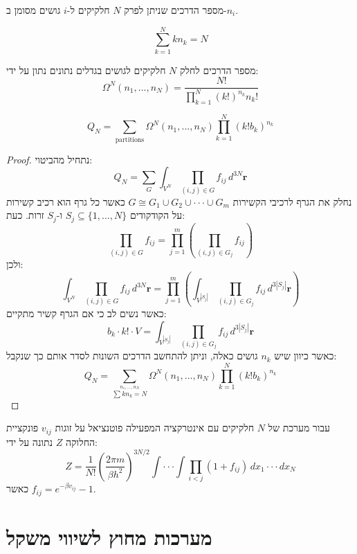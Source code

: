 \documentclass{tstextbook}
\begin{document}
\begin{symbolize}
מספר הדרכים שניתן לפרק \(N\) חלקיקים ל-\(i\) גושים מסומן ב-\(n_{i}\).

\end{symbolize}
\begin{corollary}
$$\sum_{k=1}^{N}k n_{k}=N$$

\end{corollary}
\begin{corollary}
מספר הדרכים לחלק \(N\) חלקיקים לגושים בגדלים נתונים נתון על ידי:
$$\Omega^{N}(n_{1},...,n_{N})=\frac{N!}{\prod_{k=1}^{N}(k!)^{n_{k}}n_{k}!}$$

\end{corollary}
\begin{corollary}
$$Q_{N}=\sum_{\mathrm{partitions}}\Omega^{N}(n_{1},...,n_{N})\prod_{k=1}^{N}(k!b_{k})^{n_{k}}$$

\end{corollary}
\begin{proof}
נתחיל מהביטוי:
$$Q_{N}=\sum_{G}\int_{V^{N}}\prod_{(i,j)\in G}f_{i j}\,d^{3N}\mathbf{r}$$
נחלק את הגרף לרכיבי הקשירות \(G\cong G_{1}\cup G_{2}\cup\cdot\cdot\cdot\cup G_{m}\) כאשר כל גרף הוא רכיב קשירות על הקודקודים \(S_{j}\subseteq \{ 1,\dots,N \}\) ו-\(S_{j}\) זרות. כעת:
$$\prod_{(i,j)\in G}f_{i j}=\prod_{j=1}^{m}\left(\prod_{(i,j)\in G_{j}}f_{i j}\right)$$
ולכן:
$$\int_{V^{N}}\prod_{(i,j)\in G}f_{i j}\,d^{3N}\mathbf{r}=\prod_{j=1}^{m}\left(\int_{V^{|S_{j}|}}\prod_{(i,j)\in G_{j}}f_{i j}\,d^{3|S_{j}|}\mathbf{r}\right)$$
כאשר נשים לב כי אם הגרף קשיר מתקיים:
$$b_{k}\cdot k!\cdot V =\int_{V^{|S_{j}|}}\prod_{(i,j)\in G_{j}}f_{i j}\,d^{3|S_{j}|}\mathbf{r}$$
כאשר כיוון שיש \(n_{k}\) גושים כאלה, וניתן להתחשב הדרכים השונות לסדר אותם כך שנקבל:
$$Q_{N}=\sum_{\stackrel{n_{1},\ldots,n_{N}}{\sum k n_{k}=N}}\Omega^{N}(n_{1},\ldots,n_{N})\prod_{k=1}^{N}(k!b_{k})^{n_{k}}$$

\end{proof}
\begin{proposition}
עבור מערכת של \(N\) חלקיקים עם אינטרקציה המפעילה פוטנציאל על זוגות \(v_{ij}\) פונקציית החלוקה \(Z\) נתונה על ידי:
$$Z=\frac{1}{N!}\left(\frac{2\pi m}{\beta h^{2}}\right)^{3N/2}\int\cdot\cdot\cdot\int\prod_{i<j}(1+f_{i j})\,d x_{1}\cdot\cdot\cdot d x_{N}$$
כאשר \(f_{ij}=e^{ -\beta v_{ij} }-1\).

\end{proposition}
\chapter{מערכות מחוץ לשיווי משקל}
\end{document}
